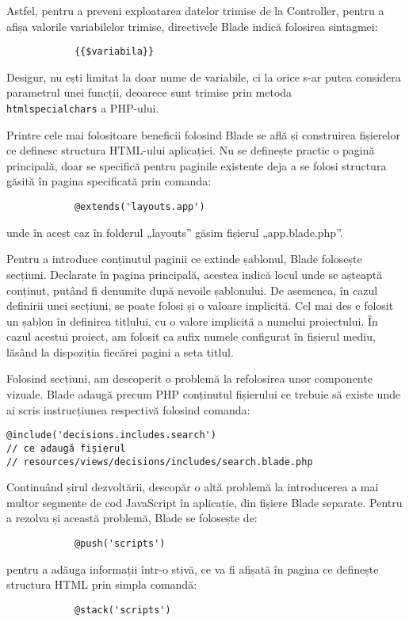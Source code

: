 		Astfel, pentru a preveni exploatarea datelor trimise de la Controller, pentru a afișa valorile variabilelor trimise, directivele Blade indică folosirea sintagmei:
			\begin{Verbatim}
			{{$variabila}}
			\end{Verbatim}

		Desigur, nu ești limitat la doar nume de variabile, ci la orice s-ar putea considera parametrul unei funcții, deoarece sunt trimise prin metoda \\
		\verb|htmlspecialchars| a PHP-ului.

		Printre cele mai folositoare beneficii folosind Blade se află și construirea fișierelor ce definesc structura HTML-ului aplicației.
		Nu se definește practic o pagină principală, doar se specifică pentru paginile existente deja a se folosi structura găsită în pagina specificată prin comanda:
		\begin{Verbatim}
			@extends('layouts.app')
		\end{Verbatim}
		unde în acest caz în folderul „layouts” găsim fișierul „app.blade.php”.

		Pentru a introduce conținutul paginii ce extinde șablonul, Blade folosește secțiuni.
		Declarate în pagina principală, acestea indică locul unde se așteaptă conținut, putând fi denumite după nevoile șablonului.
		De asemenea, în cazul definirii unei secțiuni, se poate folosi și o valoare implicită.
		Cel mai des e folosit un șablon în definirea titlului, cu o valore implicită a numelui proiectului.
		În cazul acestui proiect, am folosit ca sufix numele configurat în fișierul mediu, lăsând la dispoziția fiecărei pagini a seta titlul.

		Folosind secțiuni, am descoperit o problemă la refolosirea unor componente vizuale.
		Blade adaugă precum PHP conținutul fișierului ce trebuie să existe unde ai scris instrucțiunea respectivă folosind comanda:
		\begin{Verbatim}
@include('decisions.includes.search')
// ce adaugă fișierul
// resources/views/decisions/includes/search.blade.php
		\end{Verbatim}

		Continuând șirul dezvoltării, descopăr o altă problemă la introducerea a mai multor segmente de cod JavaScript în aplicație, din fișiere Blade separate.
		Pentru a rezolva și această problemă, Blade se folosește de:
		\begin{Verbatim}
			@push('scripts')
		\end{Verbatim}
		pentru a adăuga informații într-o stivă, ce va fi afișată în pagina ce definește structura HTML prin simpla comandă:
		\begin{Verbatim}
			@stack('scripts')
		\end{Verbatim}

